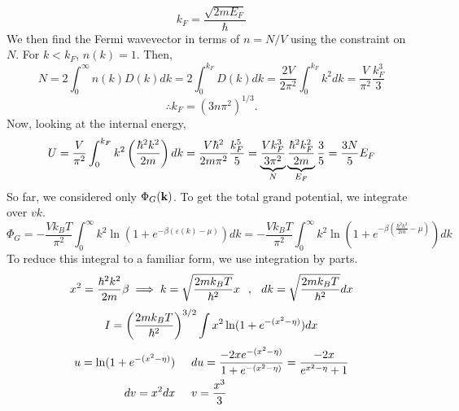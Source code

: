         \begin{equation}
            k_F = \frac{\sqrt{2mE_F}}{\hbar}
        \end{equation}
        We then find the Fermi wavevector in terms of $n=N/V$ using the constraint on $N$. For $k<k_F$, $n(k)=1$. Then,
        \begin{equation}
            N = 2\int_{0}^{\infty}n(k)D(k)dk = 2\int_{0}^{k_F}D(k)dk = \frac{2V}{2\pi^2}\int_{0}^{k_F}k^2dk = \frac{V}{\pi^2}\frac{k_F^3}{3}
        \end{equation}
        \begin{equation}
            \therefore k_F = (3n\pi^2)^{1/3}.
        \end{equation}
        Now, looking at the internal energy,
        \begin{equation}
            U = \frac{V}{\pi^2}\int_{0}^{k_F}k^2\left( \frac{\hbar^2k^2}{2m} \right)dk = \frac{V\hbar^2}{2m\pi^2}\frac{k_F^5}{5}=\underbrace{\frac{Vk_F^3}{3\pi^2}}_N\underbrace{\frac{\hbar^2k_F^2}{2m}}_{E_F}\frac{3}{5}=\frac{3N}{5}E_F
        \end{equation}
        So far, we considered only $\Phi_G(\mathbf{k})$. To get the total grand potential, we integrate over $v{k}$.
        \begin{equation}
            \Phi_G = -\frac{Vk_BT}{\pi^2}\int_{0}^{\infty}k^2\ln(1+e^{-\beta(\varepsilon(k)-\mu)})dk = -\frac{Vk_BT}{\pi^2}\int_{0}^{\infty}k^2\ln(1+e^{-\beta(\frac{\hbar^2k^2}{2m}-\mu)})dk
        \end{equation}
        To reduce this integral to a familiar form, we use integration by parts. 
        \begin{equation}
            x^2 = \frac{\hbar^2k^2}{2m}\beta\implies k=\sqrt{\frac{2mk_BT}{\hbar^2}}x \hspace{0.25cm},\hspace{0.25cm} dk = \sqrt{\frac{2mk_BT}{\hbar^2}}dx
        \end{equation}
        \begin{equation}
            I = \left( \frac{2mk_BT}{\hbar^2} \right)^{3/2}\int x^2\ln(1+e^{-(x^2-\eta)})dx
        \end{equation}
        \begin{align}
            u = \ln(1+e^{-(x^2-\eta)}) \hspace{0.5cm}& du=\frac{-2xe^{-(x^2-\eta)}}{1+e^{-(x^2-\eta)}}=\frac{-2x}{e^{x^2-\eta}+1} \\
            dv = x^2dx \hspace{0.5cm}& v =\frac{x^3}{3}
        \end{align}
